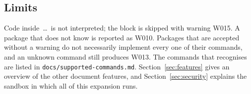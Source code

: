 \subsection{Limits}

Code inside \,\dots\, is not interpreted; the block
is skipped with warning W015. A package that \texdocx{} does not know is reported as
W010. Packages that are accepted without a warning do not
necessarily implement every one of their commands, and an unknown command still produces
W013. The commands that \texdocx{} recognises are listed in
\texttt{docs/supported-commands.md}. Section~\ref{sec:features} gives an overview of the
other document features, and Section~\ref{sec:security} explains the sandbox in which all
of this expansion runs.

